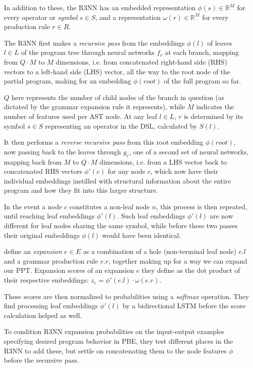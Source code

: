 \documentclass{article}
\begin{document}
In addition to these, the R3NN has an embedded representation $\phi(s) \in \mathbb{R}^M$ for every operator or \emph{symbol} $s \in S$,
and a representation $\omega(r) \in \mathbb{R}^M$ for every production rule $r \in R$.

The R3NN first makes a \emph{recursive pass} from the embeddings $\phi(l)$ of leaves $l \in L$ of the program tree through neural networks $f_r$ at each branch,
mapping from $Q \cdot M$ to $M$ dimensions,
i.e. from concatenated right-hand side (RHS) vectors to a left-hand side (LHS) vector,
all the way to the root node of the partial program,
making for an embedding $\phi(root)$ of the full program so far.

$Q$ here represents the number of child nodes of the branch in question
(as dictated by the grammar expansion rule it represents),
while $M$ indicates the number of features used per AST node.
At any leaf $l \in L$, $r$ is determined by its symbol $s \in S$
representing an operator in the DSL, calculated by $S(l)$.

It then performs a \emph{reverse recursive pass} from this root embedding $\phi(root)$,
now passing back to the leaves through $g_r$,
one of a second set of neural networks,
mapping back from $M$ to $Q \cdot M$ dimensions,
i.e. from a LHS vector back to concatenated RHS vectors $\phi'(c)$ for any node $c$,
which now have their individual embeddings instilled with structural information about the entire program and how they fit into this larger structure.

In the event a node $c$ constitutes a non-leaf node $n$,
this process is then repeated, until reaching leaf embeddings $\phi'(l)$.
Such leaf embeddings $\phi'(l)$ are now different for leaf nodes sharing the same symbol,
while before these two passes their original embeddings $\phi(l)$ would have been identical.

\citet{nsps} define an \emph{expansion} $e \in E$ as a combination of a hole (non-terminal leaf node) $e.l$ and a grammar production rule $e.r$, together making up for a way we can expand our PPT.
Expansion scores of an expansion $e$ they define as the dot product of their respective embeddings:
$z_e = \phi'(e.l) \cdot \omega(e.r)$.

These scores are then normalized to probabilities using a \emph{softmax} operation.
They find processing leaf embeddings $\phi'(l)$ by a bidirectional LSTM before the score calculation helped as well.

To condition R3NN expansion probabilities on the input-output examples specifying desired program behavior in PBE,
they test different places in the R3NN to add these,
but settle on concatenating them to the node features $\phi$ before the recursive pass.
\end{document}
